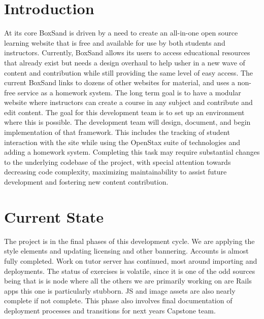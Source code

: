 \documentclass[onecolumn, draftclsnofoot,10pt, compsoc]{IEEEtran}
\begin{document}
\tableofcontents

\clearpage
\singlespacing

\section{Introduction}
At its core BoxSand is driven by a need to create an all-in-one open source learning website that is free and available for use by both students and instructors. Currently, BoxSand allows its users to access educational resources that already exist but needs a design overhaul to help usher in a new wave of content and contribution while still providing the same level of easy access. The current BoxSand links to dozens of other websites for material, and uses a non-free service as a homework system. The long term goal is to have a modular website where instructors can create a course in any subject and contribute and edit content. The goal for this development team is to set up an environment where this is possible. The development team will design, document, and begin implementation of that framework. This includes the tracking of student interaction with the site while using the OpenStax suite of technologies and adding a homework system. Completing this task may require substantial changes to the underlying codebase of the project, with special attention towards decreasing code complexity, maximizing maintainability to assist future development and fostering new content contribution.

\section{Current State}
The project is in the final phases of this development cycle. We are applying the style elements and updating licensing and other bannering. Accounts is almost fully completed. Work on tutor server has continued, most around importing and deployments. The status of exercises is volatile, since it is one of the odd sources being that is is node where all the others we are primarily working on are Rails apps this one is particularly stubborn. JS and image assets are also nearly complete if not complete. This phase also involves final documentation of deployment processes and transitions for next years Capstone team. 
\end{document}
